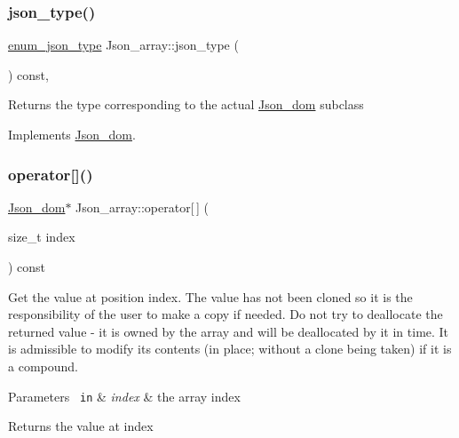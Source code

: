 \subsubsection{\texorpdfstring{json\+\_\+type()}{json\_type()}}
{\footnotesize\ttfamily \mbox{\hyperlink{classJson__dom_af37eed7dfe1da1d6507d3ab85320eb03}{enum\+\_\+json\+\_\+type}} Json\+\_\+array\+::json\+\_\+type (\begin{DoxyParamCaption}{ }\end{DoxyParamCaption}) const\hspace{0.3cm}{\ttfamily [inline]}, {\ttfamily [virtual]}}

\begin{DoxyReturn}{Returns}
the type corresponding to the actual \mbox{\hyperlink{classJson__dom}{Json\+\_\+dom}} subclass 
\end{DoxyReturn}


Implements \mbox{\hyperlink{classJson__dom_aed953eca1e112aade66511ad1bbf82b8}{Json\+\_\+dom}}.

\mbox{\label{classJson__array_ad8a78c1f2194b6b57c3bc8e529838aea}} 
\subsubsection{\texorpdfstring{operator[]()}{operator[]()}}
{\footnotesize\ttfamily \mbox{\hyperlink{classJson__dom}{Json\+\_\+dom}}$\ast$ Json\+\_\+array\+::operator\mbox{[}$\,$\mbox{]} (\begin{DoxyParamCaption}\item[{size\+\_\+t}]{index }\end{DoxyParamCaption}) const\hspace{0.3cm}{\ttfamily [inline]}}

Get the value at position index. The value has not been cloned so it is the responsibility of the user to make a copy if needed. Do not try to deallocate the returned value -\/ it is owned by the array and will be deallocated by it in time. It is admissible to modify its contents (in place; without a clone being taken) if it is a compound.


\begin{DoxyParams}[1]{Parameters}
\mbox{\texttt{ in}}  & {\em index} & the array index \\
\hline
\end{DoxyParams}
\begin{DoxyReturn}{Returns}
the value at index 
\end{DoxyReturn}
\mbox{\label{classJson__array_a377430a4a9ef9f7c22340d80b3bc74f7}} 
